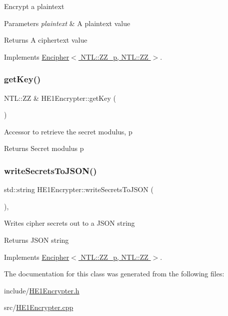 Encrypt a plaintext 
\begin{DoxyParams}{Parameters}
{\em plaintext} & A plaintext value \\
\hline
\end{DoxyParams}
\begin{DoxyReturn}{Returns}
A ciphertext value 
\end{DoxyReturn}


Implements \hyperlink{classEncipher_aaf8138eb280608bfd03c6eb762ffc010}{Encipher$<$ N\+T\+L\+::\+Z\+Z\+\_\+p, N\+T\+L\+::\+Z\+Z $>$}.

\mbox{\label{classHE1Encrypter_a014c9eca9d9979fa45dad79b355a95cc}} 
\subsubsection{\texorpdfstring{get\+Key()}{getKey()}}
{\footnotesize\ttfamily N\+T\+L\+::\+ZZ \& H\+E1\+Encrypter\+::get\+Key (\begin{DoxyParamCaption}{ }\end{DoxyParamCaption})}

Accessor to retrieve the secret modulus, {\ttfamily p} \begin{DoxyReturn}{Returns}
Secret modulus {\ttfamily p} 
\end{DoxyReturn}
\mbox{\label{classHE1Encrypter_a05627c66faf89c133a24fa7bb4553ef2}} 
\subsubsection{\texorpdfstring{write\+Secrets\+To\+J\+S\+O\+N()}{writeSecretsToJSON()}}
{\footnotesize\ttfamily std\+::string H\+E1\+Encrypter\+::write\+Secrets\+To\+J\+S\+ON (\begin{DoxyParamCaption}{ }\end{DoxyParamCaption})\hspace{0.3cm}{\ttfamily [override]}, {\ttfamily [virtual]}}

Writes cipher secrets out to a J\+S\+ON string \begin{DoxyReturn}{Returns}
J\+S\+ON string 
\end{DoxyReturn}


Implements \hyperlink{classEncipher_a27d3efa1e364c1f0d7def65454c61b85}{Encipher$<$ N\+T\+L\+::\+Z\+Z\+\_\+p, N\+T\+L\+::\+Z\+Z $>$}.



The documentation for this class was generated from the following files\+:\begin{DoxyCompactItemize}
\item 
include/\hyperlink{HE1Encrypter_8h}{H\+E1\+Encrypter.\+h}\item 
src/\hyperlink{HE1Encrypter_8cpp}{H\+E1\+Encrypter.\+cpp}\end{DoxyCompactItemize}
